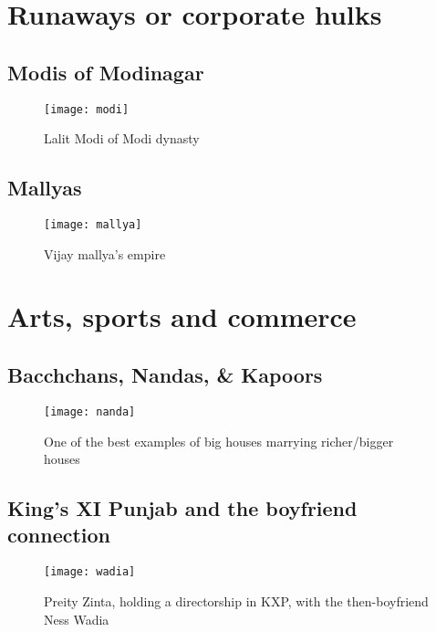 \section{Runaways or corporate hulks}

\subsection{Modis of Modinagar}

\begin{figure}[H]
\begin{center}  
\texttt{[image: modi]} 
\caption{Lalit Modi of Modi dynasty}
\label{fig:modi}
\end{center}
\end{figure}


\subsection{Mallyas}

\begin{figure}[H]
\begin{center}  
\texttt{[image: mallya]} 
\caption{Vijay mallya's empire}
\label{fig:mallya}
\end{center}
\end{figure}

\section{Arts, sports and commerce}

\subsection{Bacchchans, Nandas, \& Kapoors}

\begin{figure}[H]
\begin{center}  
\texttt{[image: nanda]} 
\caption{One of the best examples of big houses marrying richer/bigger houses}
\label{fig:nanda}
\end{center}
\end{figure}

\subsection{King's XI Punjab and the boyfriend connection}

\begin{figure}[H]
\begin{center}  
\texttt{[image: wadia]} 
\caption{Preity Zinta, holding a directorship in KXP, with the then-boyfriend Ness Wadia}
\label{fig:wadia}
\end{center}
\end{figure}


